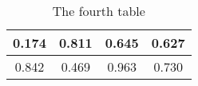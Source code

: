 \begin{longtable}{SSSS}
\caption{The fourth table}\label{}\\
\toprule

0.174	&0.811	&0.645	&0.627	\\\hline

0.842	&0.469	&0.963	&0.730	\\

\bottomrule
\end{longtable}